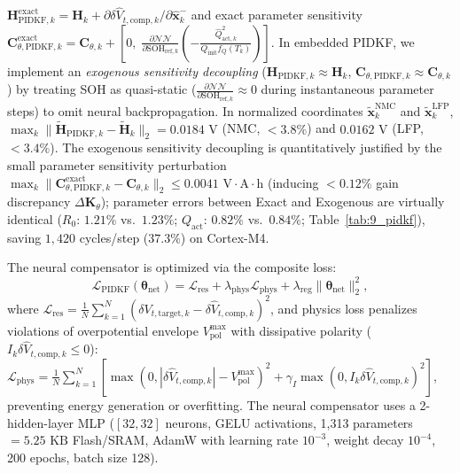 \documentclass[balance,nocopyright,upint,varvw,hyphenate,barcolor=NavyBlue,nolists]{asmejour}
\begin{document}
$\mathbf{H}_{\text{PIDKF},k}^{\text{exact}} = \mathbf{H}_k + \partial \delta \hat{V}_{t,\text{comp},k}/\partial \hat{\mathbf{x}}_k^-$ and exact parameter sensitivity $\mathbf{C}_{\theta,\text{PIDKF},k}^{\text{exact}} = \mathbf{C}_{\theta,k} + [0, \; \frac{\partial \mathcal{NN}}{\partial \text{SOH}_{\text{ref},k}}(-\frac{\hat{Q}_{\text{act},k}^2}{Q_{\text{init}} f_Q(T_k)})]$. In embedded PIDKF, we implement an \emph{exogenous sensitivity decoupling} ($\mathbf{H}_{\text{PIDKF},k} \approx \mathbf{H}_k$, $\mathbf{C}_{\theta,\text{PIDKF},k} \approx \mathbf{C}_{\theta,k}$) by treating SOH as quasi-static ($\frac{\partial \mathcal{NN}}{\partial \text{SOH}_{\text{ref},k}} \approx 0$ during instantaneous parameter steps) to omit neural backpropagation. In normalized coordinates $\tilde{\mathbf{x}}_k^{\text{NMC}}$ and $\tilde{\mathbf{x}}_k^{\text{LFP}}$, $\max_k \|\tilde{\mathbf{H}}_{\text{PIDKF},k} - \tilde{\mathbf{H}}_k\|_2 = 0.0184\text{ V}$ (NMC, $<3.8\%$) and $0.0162\text{ V}$ (LFP, $<3.4\%$). The exogenous sensitivity decoupling is quantitatively justified by the small parameter sensitivity perturbation $\max_k \|\mathbf{C}_{\theta,\text{PIDKF},k}^{\text{exact}} - \mathbf{C}_{\theta,k}\|_2 \le 0.0041\text{ V}\cdot\text{A}\cdot\text{h}$ (inducing $<0.12\%$ gain discrepancy $\Delta \mathbf{K}_\theta$); parameter errors between Exact and Exogenous are virtually identical ($R_0$: $1.21\%$ vs.\ $1.23\%$; $Q_{\text{act}}$: $0.82\%$ vs.\ $0.84\%$; Table~\ref{tab:9_pidkf}), saving $1,420$ cycles/step ($37.3\%$) on Cortex-M4.

The neural compensator is optimized via the composite loss:
\begin{equation}\label{eqn:loss_pidkf}
\mathcal{L}_{\text{PIDKF}}(\boldsymbol{\theta}_{\text{net}}) = \mathcal{L}_{\text{res}} + \lambda_{\text{phys}} \mathcal{L}_{\text{phys}} + \lambda_{\text{reg}} \|\boldsymbol{\theta}_{\text{net}}\|_2^2,
\end{equation}
where $\mathcal{L}_{\text{res}} = \frac{1}{N}\sum_{k=1}^N (\delta V_{t,\text{target},k} - \delta \hat{V}_{t,\text{comp},k})^2$, and physics loss penalizes violations of overpotential envelope $V_{\text{pol}}^{\max}$ with dissipative polarity ($I_k \delta \hat{V}_{t,\text{comp},k} \le 0$): $\mathcal{L}_{\text{phys}} = \frac{1}{N}\sum_{k=1}^N [ \max(0, |\delta \hat{V}_{t,\text{comp},k}| - V_{\text{pol}}^{\max})^2 + \gamma_I \max(0, I_k \delta \hat{V}_{t,\text{comp},k})^2 ]$, preventing energy generation or overfitting. The neural compensator uses a 2-hidden-layer MLP ($[32, 32]$ neurons, GELU activations, 1,313 parameters $= 5.25\text{ KB}$ Flash/SRAM, AdamW with learning rate $10^{-3}$, weight decay $10^{-4}$, 200 epochs, batch size 128).
\end{document}
